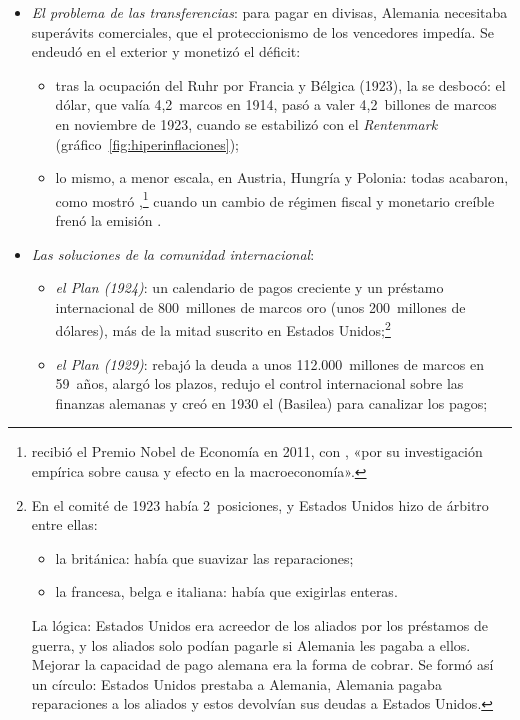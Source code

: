 \documentclass[11pt]{article}
\begin{document}
\begin{itemize}
\begin{enumerate}
  \end{enumerate}
\item \emph{El problema de las transferencias}: para pagar en divisas, Alemania necesitaba superávits comerciales, que el proteccionismo de los vencedores impedía. Se endeudó en el exterior y monetizó el déficit:
  \begin{itemize}
  \item tras la ocupación del Ruhr por Francia y Bélgica (1923), la  se desbocó: el dólar, que valía 4,2~marcos en 1914, pasó a valer 4,2~billones de marcos en noviembre de 1923, cuando se estabilizó con el \emph{Rentenmark}\nocite{Sargent1982Ends} (gráfico~\ref{fig:hiperinflaciones});
  \item lo mismo, a menor escala, en Austria, Hungría y Polonia: todas acabaron, como mostró ,\footnote{ recibió el Premio Nobel de Economía en 2011, con , «por su investigación empírica sobre causa y efecto en la macroeconomía»\nocite{Nobel2011SargentSims}.} cuando un cambio de régimen fiscal y monetario creíble frenó la emisión .
  \end{itemize}
\item \emph{Las soluciones de la comunidad internacional}:
  \begin{itemize}
  \item \emph{el Plan  (1924)}: un calendario de pagos creciente y un préstamo internacional de 800~millones de marcos oro (unos 200~millones de dólares), más de la mitad suscrito en Estados Unidos;\footnote{En el comité de 1923 había 2~posiciones, y Estados Unidos hizo de árbitro entre ellas:
\begin{itemize}
\item la británica: había que suavizar las reparaciones;
\item la francesa, belga e italiana: había que exigirlas enteras.
\end{itemize}
La lógica: Estados Unidos era acreedor de los aliados por los préstamos de guerra, y los aliados solo podían pagarle si Alemania les pagaba a ellos. Mejorar la capacidad de pago alemana era la forma de cobrar. Se formó así un círculo: Estados Unidos prestaba a Alemania, Alemania pagaba reparaciones a los aliados y estos devolvían sus deudas a Estados Unidos.}
  \item \emph{el Plan  (1929)}: rebajó la deuda a unos 112.000~millones de marcos en 59~años, alargó los plazos, redujo el control internacional sobre las finanzas alemanas y creó en 1930 el  (Basilea) para canalizar los pagos\nocite{Eichengreen2019Globalizing};

\end{itemize}
\end{itemize}
\end{document}
